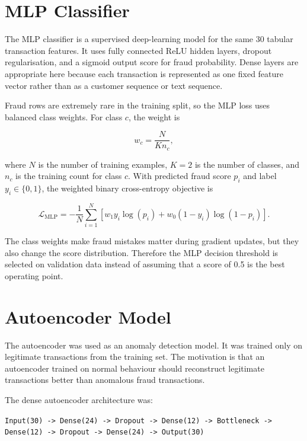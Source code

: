\documentclass[12pt,a4paper]{report}
\begin{document}
\section{MLP Classifier}

The MLP classifier is a supervised deep-learning model for the same 30 tabular transaction features. It uses fully connected ReLU hidden layers, dropout regularisation, and a sigmoid output score for fraud probability. Dense layers are appropriate here because each transaction is represented as one fixed feature vector rather than as a customer sequence or text sequence.

Fraud rows are extremely rare in the training split, so the MLP loss uses balanced class weights. For class $c$, the weight is

\begin{equation}
    w_c = \frac{N}{K n_c},
\end{equation}

where $N$ is the number of training examples, $K=2$ is the number of classes, and $n_c$ is the training count for class $c$. With predicted fraud score $p_i$ and label $y_i \in \{0,1\}$, the weighted binary cross-entropy objective is

\begin{equation}
    \mathcal{L}_{\mathrm{MLP}}
    = -\frac{1}{N}\sum_{i=1}^{N}
    \left[
        w_1 y_i \log(p_i)
        + w_0 (1-y_i)\log(1-p_i)
    \right].
\end{equation}

The class weights make fraud mistakes matter during gradient updates, but they also change the score distribution. Therefore the MLP decision threshold is selected on validation data instead of assuming that a score of 0.5 is the best operating point.

\section{Autoencoder Model}

The autoencoder was used as an anomaly detection model. It was trained only on legitimate transactions from the training set. The motivation is that an autoencoder trained on normal behaviour should reconstruct legitimate transactions better than anomalous fraud transactions.

The dense autoencoder architecture was:

\begin{center}
\texttt{Input(30) -> Dense(24) -> Dropout -> Dense(12) -> Bottleneck -> Dense(12) -> Dropout -> Dense(24) -> Output(30)}
\end{center}
\end{document}
